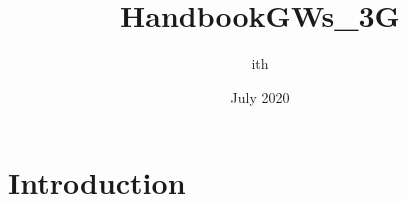 \documentclass{article}
\title{HandbookGWs_3G}
\author{ith }
\date{July 2020}
\begin{document}
\maketitle

\section{Introduction}
\end{document}
